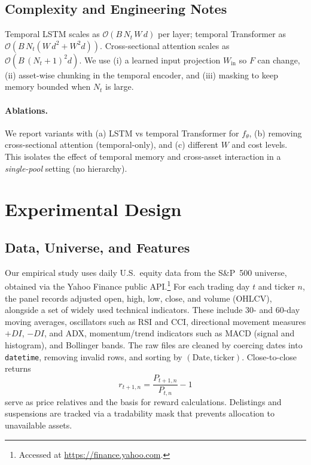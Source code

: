 \documentclass[10pt,leqno]{amsart}
\begin{document}
\subsection{Complexity and Engineering Notes}
Temporal LSTM scales as $\mathcal{O}(B\,N_t\,W\,d)$ per layer; temporal Transformer as $\mathcal{O}(B\,N_t(W\,d^2 + W^2 d))$. Cross-sectional attention scales as $\mathcal{O}(B\,(N_t{+}1)^2 d)$. We use (i) a learned input projection $W_{\mathrm{in}}$ so $F$ can change, (ii) asset-wise chunking in the temporal encoder, and (iii) masking to keep memory bounded when $N_t$ is large.

\paragraph{Ablations.}
We report variants with (a) LSTM vs temporal Transformer for $f_\theta$, (b) removing cross-sectional attention (temporal-only), and (c) different $W$ and cost levels. This isolates the effect of temporal memory and cross-asset interaction in a \emph{single-pool} setting (no hierarchy).



\section{Experimental Design}\label{sec6}

\subsection{Data, Universe, and Features}
Our empirical study uses daily U.S.\ equity data from the S\&P~500 universe, obtained via the Yahoo Finance public API.\footnote{Accessed at \url{https://finance.yahoo.com}.} For each trading day $t$ and ticker $n$, the panel records adjusted open, high, low, close, and volume (OHLCV), alongside a set of widely used technical indicators. These include 30- and 60-day moving averages, oscillators such as RSI and CCI, directional movement measures $+DI$, $-DI$, and ADX, momentum/trend indicators such as MACD (signal and histogram), and Bollinger bands. The raw files are cleaned by coercing dates into \texttt{datetime}, removing invalid rows, and sorting by $(\text{Date},\text{ticker})$. Close-to-close returns
\[
r_{t+1,n} = \frac{P_{t+1,n}}{P_{t,n}} - 1
\]
serve as price relatives and the basis for reward calculations. Delistings and suspensions are tracked via a tradability mask that prevents allocation to unavailable assets.
\end{document}
